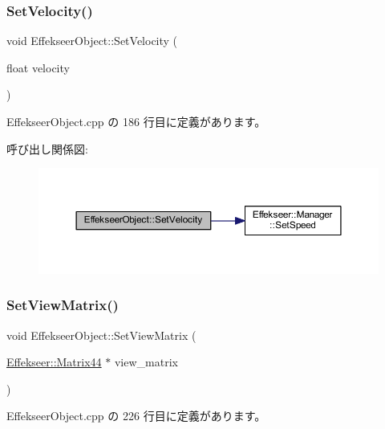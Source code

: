 \subsubsection{\texorpdfstring{Set\+Velocity()}{SetVelocity()}}
{\footnotesize\ttfamily void Effekseer\+Object\+::\+Set\+Velocity (\begin{DoxyParamCaption}\item[{float}]{velocity }\end{DoxyParamCaption})}



 Effekseer\+Object.\+cpp の 186 行目に定義があります。

呼び出し関係図\+:\nopagebreak
\begin{figure}[H]
\begin{center}
\leavevmode
\includegraphics[width=350pt]{class_effekseer_object_a3c14fd4215640b648b14e445b99564f7_cgraph}
\end{center}
\end{figure}
\mbox{\label{class_effekseer_object_ac7f3145b79b5e65e45014abd30ee5de8}} 
\subsubsection{\texorpdfstring{Set\+View\+Matrix()}{SetViewMatrix()}}
{\footnotesize\ttfamily void Effekseer\+Object\+::\+Set\+View\+Matrix (\begin{DoxyParamCaption}\item[{\mbox{\hyperlink{struct_effekseer_1_1_matrix44}{Effekseer\+::\+Matrix44}} $\ast$}]{view\+\_\+matrix }\end{DoxyParamCaption})}



 Effekseer\+Object.\+cpp の 226 行目に定義があります。

